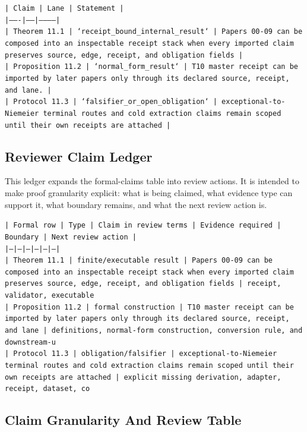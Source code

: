 \documentclass[11pt]{article}
\begin{document}
\noindent\texttt{| Claim | Lane | Statement |}\\
\noindent\texttt{|-------|------|-----------|}\\
\noindent\texttt{| Theorem 11.1 | `receipt\_bound\_internal\_result` | Papers 00-09 can be composed into an inspectable receipt stack when every imported claim preserves source, edge, receipt, and obligation fields |}\\
\noindent\texttt{| Proposition 11.2 | `normal\_form\_result` | T10 master receipt can be imported by later papers only through its declared source, receipt, and lane. |}\\
\noindent\texttt{| Protocol 11.3 | `falsifier\_or\_open\_obligation` | exceptional-to-Niemeier terminal routes and cold extraction claims remain scoped until their own receipts are attached |}\\

\subsection*{Reviewer Claim Ledger}

This ledger expands the formal-claims table into review actions. It is intended to make proof granularity explicit: what is being claimed, what evidence type can support it, what boundary remains, and what the next review action is.

\noindent\texttt{| Formal row | Type | Claim in review terms | Evidence required | Boundary | Next review action |}\\
\noindent\texttt{|---|---|---|---|---|---|}\\
\noindent\texttt{| Theorem 11.1 | finite/executable result | Papers 00-09 can be composed into an inspectable receipt stack when every imported claim preserves source, edge, receipt, and obligation fields | receipt, validator, executable}\\
\noindent\texttt{| Proposition 11.2 | formal construction | T10 master receipt can be imported by later papers only through its declared source, receipt, and lane | definitions, normal-form construction, conversion rule, and downstream-u}\\
\noindent\texttt{| Protocol 11.3 | obligation/falsifier | exceptional-to-Niemeier terminal routes and cold extraction claims remain scoped until their own receipts are attached | explicit missing derivation, adapter, receipt, dataset, co}\\

\subsection*{Claim Granularity And Review Table}
\end{document}
